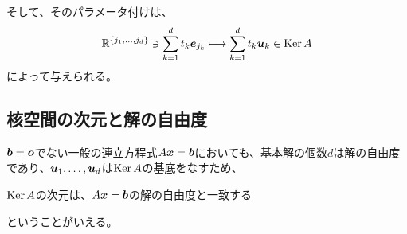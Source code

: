 \documentclass[../../../topic_linear-algebra]{subfiles}
\begin{document}
\br

そして、そのパラメータ付けは、
\begin{equation*}
  \mathbb{R}^{\{ j_1, \dots, j_d \}} \ni \sum_{k=1}^d t_k \vb*{e}_{j_k} \longmapsto \sum_{k=1}^d t_k \vb*{u}_k \in \operatorname{Ker} A
\end{equation*}
によって与えられる。

\subsection{核空間の次元と解の自由度}\label{sec:nullity-solution-degrees}

$\vb*{b} = \vb*{o}$でない一般の連立方程式$A\vb*{x} = \vb*{b}$においても、\hyperref[sec:degrees-of-freedom]{基本解の個数$d$は解の自由度}であり、$\vb*{u}_1, \ldots, \vb*{u}_d$は$\operatorname{Ker} A$の基底をなすため、
\begin{emphabox}
  \begin{spacebox}
    \begin{center}
      $\operatorname{Ker} A$の次元は、$A\vb*{x} = \vb*{b}$の解の自由度と一致する
    \end{center}
  \end{spacebox}
\end{emphabox}
ということがいえる。
\end{document}
